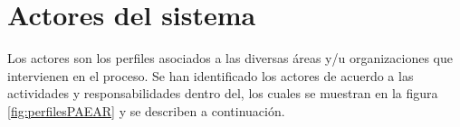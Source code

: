 \section{Actores del sistema}

Los actores son los perfiles asociados a las diversas áreas y/u organizaciones que intervienen en el proceso. Se han identificado los actores de acuerdo a las actividades y responsabilidades dentro del, los cuales se muestran en la figura \ref{fig:perfilesPAEAR} y se describen a continuación.



